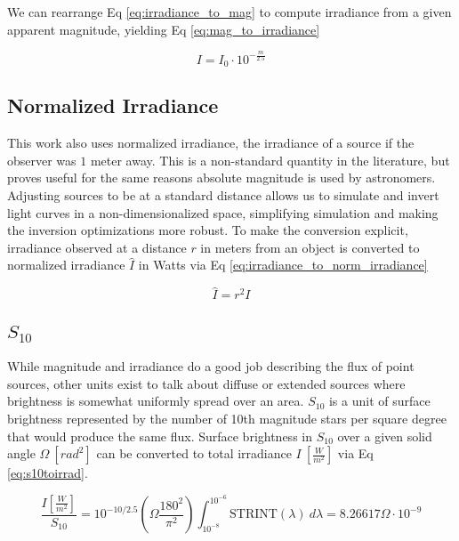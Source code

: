 We can rearrange Eq \ref{eq:irradiance_to_mag} to compute irradiance from a given apparent magnitude,
yielding Eq \ref{eq:mag_to_irradiance}

\begin{equation} \label{eq:mag_to_irradiance}
  I = I_0 \cdot 10^{-\frac{m}{2.5}}
\end{equation}

\subsection{Normalized Irradiance}

This work also uses normalized irradiance, the irradiance of a source if the observer was $1$ meter
away. This is a non-standard quantity in the literature, but proves useful for the same reasons
absolute magnitude is used by astronomers. Adjusting sources to be at a standard distance allows us
to simulate and invert light curves in a non-dimensionalized space, simplifying simulation and
making the inversion optimizations more robust. To make the conversion explicit, irradiance observed
at a distance $r$ in meters from an object is converted to normalized irradiance $\hat{I}$ in Watts via Eq
\ref{eq:irradiance_to_norm_irradiance}

\begin{equation} \label{eq:irradiance_to_norm_irradiance}
  \hat{I} = r^2 I
\end{equation}

\subsection{$S_{10}$}

While magnitude and irradiance do a good job describing the flux of point sources, other units exist
to talk about diffuse or extended sources where brightness is somewhat uniformly spread over an
area. $S_{10}$ is a unit of surface brightness represented by the number of 10th magnitude stars per square degree that would produce the same flux.
Surface brightness in $S_{10}$ over a given solid angle $\Omega \: \left[ rad^2 \right]$ can be converted to total irradiance $I \: \left[ \frac{W}{m^2} \right]$ via Eq \ref{eq:s10toirrad}.

\begin{equation} \label{eq:s10toirrad}
 \frac{I \left[ \frac{W}{m^2} \right]}{S_{10}} = 10^{-10/2.5} \left( \Omega \frac{180^2}{\pi^2} \right)
  \int_{10^{-8}}^{10^{-6}}{ \textrm{STRINT}(\lambda) \: d\lambda} = 8.26617 \Omega \cdot 10^{-9}
\end{equation}

